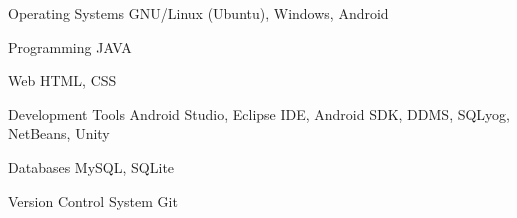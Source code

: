 

\begin{cvskills}

  \cvskill
    {Operating Systems} %
    {GNU/Linux (Ubuntu), Windows, Android } %

  \cvskill
    {Programming} %
    {JAVA} %

  \cvskill
    {Web} %
    {HTML, CSS} %

  \cvskill
    {Development Tools} %
    {Android Studio, Eclipse IDE, Android SDK, DDMS, SQLyog, NetBeans, Unity} %


  \cvskill
    {Databases} %
    {MySQL, SQLite} %


  \cvskill
    {Version Control System} %
    {Git} %


\end{cvskills}

